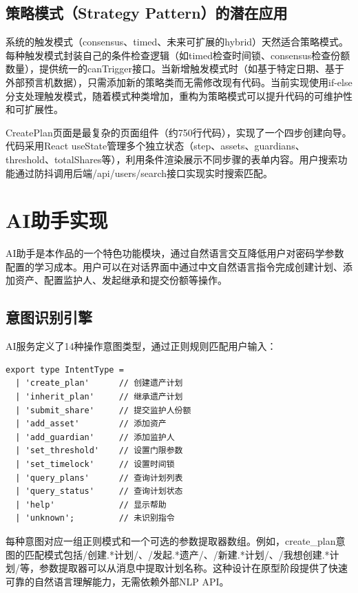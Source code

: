 \documentclass[UTF8,a4paper,zihao=-4,openany]{ctexrep}
\begin{document}
\subsection{策略模式（Strategy Pattern）的潜在应用}

系统的触发模式（consensus、timed、未来可扩展的hybrid）天然适合策略模式。每种触发模式封装自己的条件检查逻辑（如timed检查时间锁、consensus检查份额数量），提供统一的canTrigger接口。当新增触发模式时（如基于特定日期、基于外部预言机数据），只需添加新的策略类而无需修改现有代码。当前实现使用if-else分支处理触发模式，随着模式种类增加，重构为策略模式可以提升代码的可维护性和可扩展性。

CreatePlan页面是最复杂的页面组件（约750行代码），实现了一个四步创建向导。代码采用React useState管理多个独立状态（step、assets、guardians、threshold、totalShares等），利用条件渲染展示不同步骤的表单内容。用户搜索功能通过防抖调用后端/api/users/search接口实现实时搜索匹配。

\section{AI助手实现}

AI助手是本作品的一个特色功能模块，通过自然语言交互降低用户对密码学参数配置的学习成本。用户可以在对话界面中通过中文自然语言指令完成创建计划、添加资产、配置监护人、发起继承和提交份额等操作。

\subsection{意图识别引擎}

AI服务定义了14种操作意图类型，通过正则规则匹配用户输入：

\begin{lstlisting}[caption={意图类型定义 (aiService.ts:4-16)}]
export type IntentType =
  | 'create_plan'      // 创建遗产计划
  | 'inherit_plan'     // 继承遗产计划
  | 'submit_share'     // 提交监护人份额
  | 'add_asset'        // 添加资产
  | 'add_guardian'     // 添加监护人
  | 'set_threshold'    // 设置门限参数
  | 'set_timelock'     // 设置时间锁
  | 'query_plans'      // 查询计划列表
  | 'query_status'     // 查询计划状态
  | 'help'             // 显示帮助
  | 'unknown';         // 未识别指令
\end{lstlisting}

每种意图对应一组正则模式和一个可选的参数提取器数组。例如，create\_plan意图的匹配模式包括/创建.*计划/、/发起.*遗产/、/新建.*计划/、/我想创建.*计划/等，参数提取器可以从消息中提取计划名称。这种设计在原型阶段提供了快速可靠的自然语言理解能力，无需依赖外部NLP API。
\end{document}
